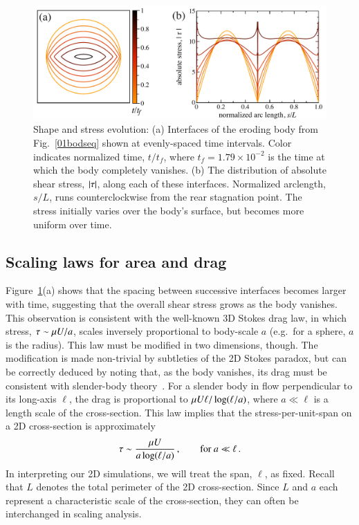 \documentclass[preprint, 10pt]{elsarticle}
\begin{document}
\begin{figure}%
\begin{center}
\includegraphics[width = 0.8 \textwidth]{./figs/shrink_intface.pdf}
\caption{
Shape and stress evolution: (a) Interfaces of the eroding body from Fig.~\ref{01bodseq} shown at evenly-spaced time intervals. Color indicates normalized time, $t/t_f$, where $t_f = 1.79 \times 10^{-2}$ is the time at which the body completely vanishes. (b) The distribution of absolute shear stress, $\lvert \tau \rvert$, along each of these interfaces. Normalized arclength, $s/L$, runs counterclockwise from the rear stagnation point. The stress initially varies over the body's surface, but becomes more uniform over time.}
\label{shrink_intface}
\end{center}
\end{figure}

\subsection{Scaling laws for area and drag}
\label{sec:scaling}

Figure~\ref{shrink_intface}(a) shows that the spacing between successive interfaces becomes larger with time, suggesting that the overall shear stress grows as the body vanishes. This observation is consistent with the well-known 3D Stokes drag law, in which stress, $\tau \sim \mu U / a$, scales inversely proportional to body-scale $a$ (e.g.~for a sphere, $a$ is the radius). This law must be modified in two dimensions, though. The modification is made non-trivial by subtleties of the 2D Stokes paradox, but can be correctly deduced by noting that, as the body vanishes, its drag must be consistent with slender-body theory~\cite{batchelor1970slender, MooreJFM2012}.  For a slender body in flow perpendicular to its long-axis $\ell$, the drag is proportional to $\mu U \ell/ \log(\ell/a)$, where $a \ll \ell $ is a length scale of the cross-section. This law implies that the stress-per-unit-span on a 2D cross-section is approximately
\begin{align}
  \label{eqn:stresslaw}
  \tau \sim \frac{\mu U}{a \log(\ell/a)}\, , \qquad \text{for } a \ll \ell \, .
\end{align}
In interpreting our 2D simulations, we will treat the span, $\ell$, as fixed. Recall that $L$ denotes the total perimeter of the 2D cross-section. Since $L$ and $a$ each represent a characteristic scale of the cross-section, they can often be interchanged in scaling analysis.  
\end{document}
